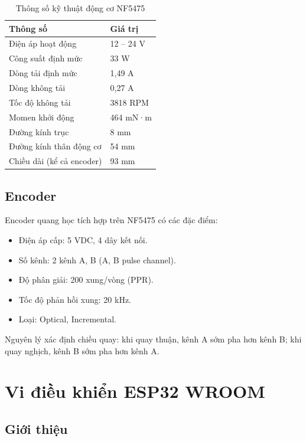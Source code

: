 \begin{table}[H]
\centering
\caption{Thông số kỹ thuật động cơ NF5475}
\label{tab:nf5475_spec}
\renewcommand{\arraystretch}{1.3}
\begin{tabular}{|l|l|}
\hline
\textbf{Thông số} & \textbf{Giá trị} \\
\hline
Điện áp hoạt động & 12 -- 24 V \\
Công suất định mức & 33 W \\
Dòng tải định mức & 1,49 A \\
Dòng không tải & 0,27 A \\
Tốc độ không tải & 3818 RPM \\
Momen khởi động & 464 mN·m \\
Đường kính trục & 8 mm \\
Đường kính thân động cơ & 54 mm \\
Chiều dài (kể cả encoder) & 93 mm \\
\hline
\end{tabular}
\end{table}

\subsection{Encoder}

Encoder quang học tích hợp trên NF5475 có các đặc điểm:
\begin{itemize}
    \item Điện áp cấp: 5 VDC, 4 dây kết nối.
    \item Số kênh: 2 kênh A, B (A, B pulse channel).
    \item Độ phân giải: 200 xung/vòng (PPR).
    \item Tốc độ phản hồi xung: 20 kHz.
    \item Loại: Optical, Incremental.
\end{itemize}

Nguyên lý xác định chiều quay: khi quay thuận, kênh A sớm pha hơn kênh B;
khi quay nghịch, kênh B sớm pha hơn kênh A.


\section{Vi điều khiển ESP32 WROOM}

\subsection{Giới thiệu}

